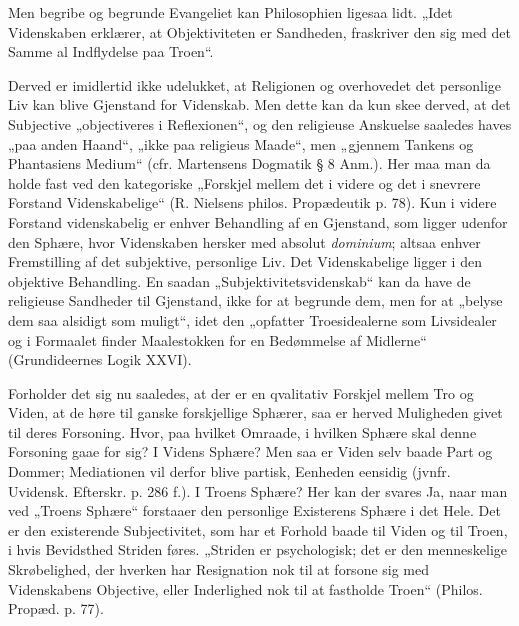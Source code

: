 \documentclass[12pt,a4paper]{book}
\newcommand{\opage}[1]{\marginnote{\footnotesize\textit{[#1]}}}
\begin{document}
Men begribe og begrunde Evangeliet kan Philosophien
ligesaa lidt. „Idet Videnskaben erklærer, at Objektiviteten er
Sandheden, fraskriver den sig med det Samme al Indflydelse
paa Troen“.

Derved er imidlertid ikke udelukket, at Religionen og
overhovedet det personlige Liv kan blive Gjenstand for Videnskab.
Men dette kan da kun skee derved, at det Subjective
„objectiveres i Reflexionen“, og den religieuse Anskuelse saaledes
haves „paa anden Haand“, „ikke paa religieus Maade“, men
„gjennem Tankens og Phantasiens Medium“ (cfr. Martensens
Dogmatik § 8 Anm.). Her maa man da holde fast ved den
kategoriske „Forskjel mellem det i videre og det i snevrere Forstand
Videnskabelige“ (R. Nielsens philos. Propædeutik p. 78).
Kun i videre Forstand videnskabelig er enhver Behandling af
en Gjenstand, som ligger udenfor den Sphære, hvor Videnskaben
hersker med absolut \textit{dominium}; altsaa enhver Fremstilling
af det subjektive, personlige Liv. Det Videnskabelige
ligger i den objektive Behandling. En saadan „Subjektivitetsvidenskab“
kan da have de religieuse Sandheder til Gjenstand,
ikke for at begrunde dem, men for at „belyse dem saa alsidigt
som muligt“, idet den „opfatter Troesidealerne som Livsidealer
og i Formaalet finder Maalestokken for en Bedømmelse af
Midlerne“ (Grundideernes Logik XXVI).

Forholder det sig nu saaledes, at der er en qvalitativ
Forskjel mellem Tro og Viden, at de høre til ganske forskjellige
Sphærer, saa er herved Muligheden givet til deres
Forsoning. Hvor, paa hvilket Omraade, i hvilken Sphære
\opage{41}\setcounter{footnote}{0}%
skal denne Forsoning gaae for sig? I Videns Sphære? Men
saa er Viden selv baade Part og Dommer; Mediationen vil
derfor blive partisk, Eenheden eensidig (jvnfr. Uvidensk. Efterskr.
p. 286 f.). I Troens Sphære? Her kan der svares Ja,
naar man ved „Troens Sphære“ forstaaer den personlige
Existerens Sphære i det Hele. Det er den existerende Subjectivitet,
som har et Forhold baade til Viden og til Troen, i
hvis Bevidsthed Striden føres. „Striden er psychologisk; det
er den menneskelige Skrøbelighed, der hverken har Resignation
nok til at forsone sig med Videnskabens Objective, eller Inderlighed
nok til at fastholde Troen“ (Philos. Propæd. p. 77).
\end{document}
